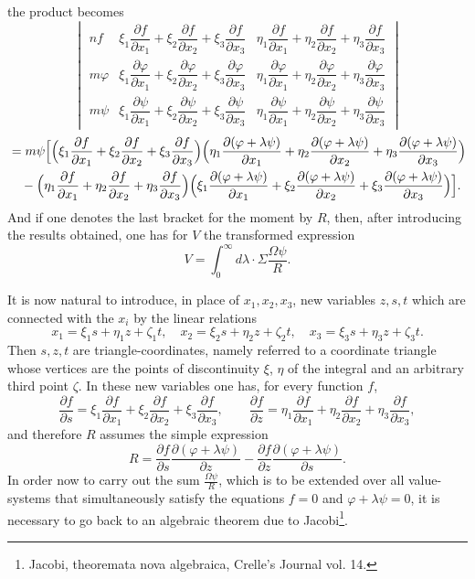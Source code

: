 \documentclass[10pt]{article}
\begin{document}
the product becomes
\[
\begin{vmatrix}
nf&\xi_1\dfrac{\partial f}{\partial x_1}+\xi_2\dfrac{\partial f}{\partial x_2}+\xi_3\dfrac{\partial f}{\partial x_3}&\eta_1\dfrac{\partial f}{\partial x_1}+\eta_2\dfrac{\partial f}{\partial x_2}+\eta_3\dfrac{\partial f}{\partial x_3}\\
m\varphi&\xi_1\dfrac{\partial\varphi}{\partial x_1}+\xi_2\dfrac{\partial\varphi}{\partial x_2}+\xi_3\dfrac{\partial\varphi}{\partial x_3}&\eta_1\dfrac{\partial\varphi}{\partial x_1}+\eta_2\dfrac{\partial\varphi}{\partial x_2}+\eta_3\dfrac{\partial\varphi}{\partial x_3}\\
m\psi&\xi_1\dfrac{\partial\psi}{\partial x_1}+\xi_2\dfrac{\partial\psi}{\partial x_2}+\xi_3\dfrac{\partial\psi}{\partial x_3}&\eta_1\dfrac{\partial\psi}{\partial x_1}+\eta_2\dfrac{\partial\psi}{\partial x_2}+\eta_3\dfrac{\partial\psi}{\partial x_3}
\end{vmatrix}
\]
\[
\begin{aligned}
&=m\psi\Bigl[\Bigl(\xi_1\frac{\partial f}{\partial x_1}+\xi_2\frac{\partial f}{\partial x_2}+\xi_3\frac{\partial f}{\partial x_3}\Bigr)\Bigl(\eta_1\frac{\partial(\varphi+\lambda\psi)}{\partial x_1}+\eta_2\frac{\partial(\varphi+\lambda\psi)}{\partial x_2}+\eta_3\frac{\partial(\varphi+\lambda\psi)}{\partial x_3}\Bigr)\\
&\quad-\Bigl(\eta_1\frac{\partial f}{\partial x_1}+\eta_2\frac{\partial f}{\partial x_2}+\eta_3\frac{\partial f}{\partial x_3}\Bigr)\Bigl(\xi_1\frac{\partial(\varphi+\lambda\psi)}{\partial x_1}+\xi_2\frac{\partial(\varphi+\lambda\psi)}{\partial x_2}+\xi_3\frac{\partial(\varphi+\lambda\psi)}{\partial x_3}\Bigr)\Bigr].
\end{aligned}
\]
And if one denotes the last bracket for the moment by $R$, then, after introducing the results obtained, one has for $V$ the transformed expression
\[
V=\int_0^\infty d\lambda\cdot\Sigma\frac{\Omega\psi}{R}.
\]

It is now natural to introduce, in place of $x_1,x_2,x_3$, new variables $z,s,t$ which are connected with the $x_i$ by the linear relations
\[
x_1=\xi_1s+\eta_1z+\zeta_1t,\quad
x_2=\xi_2s+\eta_2z+\zeta_2t,\quad
x_3=\xi_3s+\eta_3z+\zeta_3t.
\]
Then $s,z,t$ are triangle-coordinates, namely referred to a coordinate triangle whose vertices are the points of discontinuity $\xi$, $\eta$ of the integral and an arbitrary third point $\zeta$. In these new variables one has, for every function $f$,
\[
\frac{\partial f}{\partial s}=\xi_1\frac{\partial f}{\partial x_1}+\xi_2\frac{\partial f}{\partial x_2}+\xi_3\frac{\partial f}{\partial x_3},\qquad
\frac{\partial f}{\partial z}=\eta_1\frac{\partial f}{\partial x_1}+\eta_2\frac{\partial f}{\partial x_2}+\eta_3\frac{\partial f}{\partial x_3},
\]
and therefore $R$ assumes the simple expression
\[
R=\frac{\partial f}{\partial s}\frac{\partial(\varphi+\lambda\psi)}{\partial z}
-\frac{\partial f}{\partial z}\frac{\partial(\varphi+\lambda\psi)}{\partial s}.
\]
In order now to carry out the sum $\frac{\Omega\psi}{R}$, which is to be extended over all value-systems that simultaneously satisfy the equations $f=0$ and $\varphi+\lambda\psi=0$, it is necessary to go back to an algebraic theorem due to Jacobi\footnote{Jacobi, theoremata nova algebraica, Crelle's Journal vol. 14.}.
\end{document}

